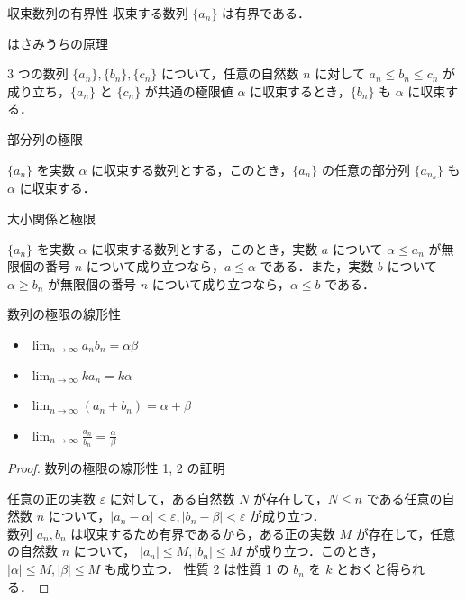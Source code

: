\documentclass[a4paper]{ltjsarticle}
\begin{document}
\begin{theorem}{収束数列の有界性}{}
収束する数列 $\{a_n\}$ は有界である．
\end{theorem}

\begin{theorem}{はさみうちの原理}{}

3 つの数列 $\{a_n\}, \{b_n\}, \{c_n\}$ について，任意の自然数 $n$ に対して $a_n \leq b_n \leq c_n$ が成り立ち，$\{a_n\}$ と $\{c_n\}$ が共通の極限値 $\alpha$ に収束するとき，$\{b_n\}$ も $\alpha$ に収束する．

\end{theorem}

\begin{theorem}{部分列の極限}{}

$\{a_n\}$ を実数 $\alpha$ に収束する数列とする，このとき，$\{a_n\}$ の任意の部分列 $\{a_{n_k}\}$ も $\alpha$ に収束する．

\end{theorem}

\begin{theorem}{大小関係と極限}{}

$\{a_n\}$ を実数 $\alpha$ に収束する数列とする，このとき，実数 $a$ について $\alpha \leq a_n$ が無限個の番号 $n$ について成り立つなら，$a \leq \alpha$ である．また，実数 $b$ について $\alpha \geq b_n$ が無限個の番号 $n$ について成り立つなら，$\alpha \leq b$ である．

\end{theorem}

\pagebreak
\begin{theorem}{数列の極限の線形性}{}
\begin{itemize}
\item[1 ] $\lim_{n \to \infty} a_n b_n = \alpha \beta$
\item[2 ] $\lim_{n \to \infty} k a_n = k\alpha$
\item[3 ] $\lim_{n \to \infty} (a_n + b_n) = \alpha + \beta$
\item[4 ] $\lim_{n \to \infty} \frac{a_n}{b_n} = \frac{\alpha}{\beta}$
\end{itemize}
\end{theorem}

\begin{proof}{数列の極限の線形性 1, 2 の証明}{}

任意の正の実数 $\varepsilon$ に対して，ある自然数 $N$ が存在して，$N \leq n$ である任意の自然数 $n$ について，$|a_n - \alpha| < \varepsilon, |b_n - \beta| < \varepsilon$ が成り立つ．
\\
数列 ${a_n}, {b_n}$ は収束するため有界であるから，ある正の実数 $M$ が存在して，任意の自然数 $n$ について， $|a_n| \leq M, |b_n| \leq M$ が成り立つ．このとき，$|\alpha| \leq M, |\beta| \leq M$ も成り立つ．
性質 2 は性質 1 の $b_n$ を $k$ とおくと得られる．

\end{proof}
\end{document}
